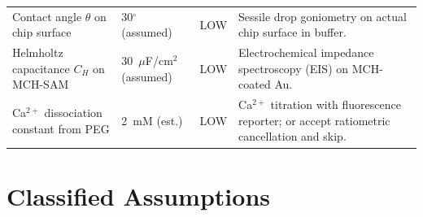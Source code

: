 \documentclass[10pt,a4paper]{article}
\begin{document}
\begin{table}[H]
{\begin{tabularx}{\linewidth}{p{3.6cm}p{2.8cm}p{1.4cm}p{6.0cm}}
Contact angle $\theta$ on chip surface & 30$^\circ$ (assumed) & LOW & Sessile drop goniometry on actual chip surface in buffer. \\
Helmholtz capacitance $C_H$ on MCH-SAM & 30~$\mu$F/cm$^2$ (assumed) & LOW & Electrochemical impedance spectroscopy (EIS) on MCH-coated Au. \\
Ca$^{2+}$ dissociation constant from PEG & 2~mM (est.) & LOW & Ca$^{2+}$ titration with fluorescence reporter; or accept ratiometric cancellation and skip. \\
\bottomrule
\end{tabularx}
}
\end{table}

\section{Classified Assumptions}
\end{document}

